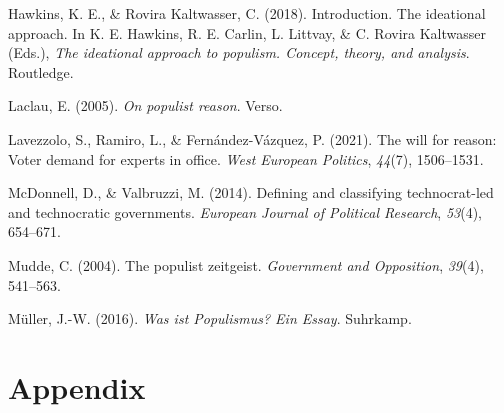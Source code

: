\documentclass[
  12pt,
  english,
]{article}
\newlength{\cslhangindent}
\newlength{\cslentryspacingunit} %
\newenvironment{CSLReferences}[2] %
 {%
  \setlength{\parindent}{0pt}
  \ifodd #1
  \let\oldpar\par
  \def\par{\hangindent=\cslhangindent\oldpar}
  \fi
  \setlength{\parskip}{#2\cslentryspacingunit}
 }%
 {}
\begin{document}
\begin{CSLReferences}{1}{0}
\leavevmode{}%
Hawkins, K. E., \& Rovira Kaltwasser, C. (2018). Introduction. The
ideational approach. In K. E. Hawkins, R. E. Carlin, L. Littvay, \& C.
Rovira Kaltwasser (Eds.), \emph{The ideational approach to populism.
Concept, theory, and analysis}. Routledge.

\leavevmode{}%
Laclau, E. (2005). \emph{On populist reason}. Verso.

\leavevmode{}%
Lavezzolo, S., Ramiro, L., \& Fernández-Vázquez, P. (2021). The will for
reason: Voter demand for experts in office. \emph{West European
Politics}, \emph{44}(7), 1506--1531.

\leavevmode{}%
McDonnell, D., \& Valbruzzi, M. (2014). Defining and classifying
technocrat-led and technocratic governments. \emph{European Journal of
Political Research}, \emph{53}(4), 654--671.

\leavevmode{}%
Mudde, C. (2004). The populist zeitgeist. \emph{Government and
Opposition}, \emph{39}(4), 541--563.

\leavevmode{}%
Müller, J.-W. (2016). \emph{Was ist {Populismus}? Ein {Essay}}.
Suhrkamp.

\end{CSLReferences}

\newpage{}

\hypertarget{appendix}{%
\section{Appendix}\label{appendix}}
\end{document}
